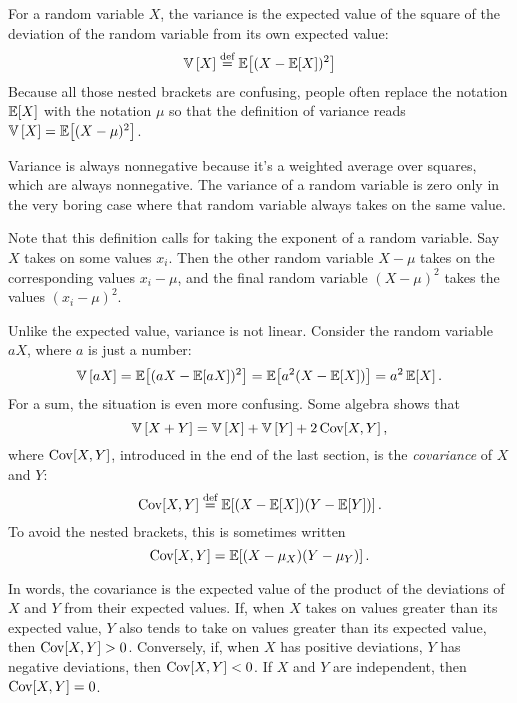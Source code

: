 For a random variable $X$, the variance is the expected value of the square of
the deviation of the random variable from its own expected value:
\begin{equation*}
\mathbb{V}\left[{X}\right] \stackrel{\text{def}}{=} \mathbb{E}\!\left[{(X - \mathbb{E}\!\left[{X}\right])^2}\right]
\end{equation*}
Because all those nested brackets are confusing, people often replace the
notation $\mathbb{E}\!\left[{X}\right]$ with the notation $\mu$ so that the definition of
variance reads $\mathbb{V}\left[{X}\right] = \mathbb{E}\!\left[{(X - \mu)^2}\right]$.

Variance is always nonnegative because it's a weighted average over squares,
which are always nonnegative. The variance of a random variable is zero only
in the very boring case where that random variable always takes on the same
value.

Note that this definition calls for taking the exponent of a random variable.
Say $X$ takes on some values $x_i$. Then the other random variable $X - \mu$
takes on the corresponding values $x_i - \mu$, and the final random variable
$(X - \mu)^2$ takes the values $(x_i - \mu)^2$.

Unlike the expected value, variance is not linear. Consider the random variable $aX$,
where $a$ is just a number:
\begin{equation}
\mathbb{V}\left[{aX}\right] = \mathbb{E}\!\left[{(aX - \mathbb{E}\!\left[{aX}\right])^2}\right] = \mathbb{E}\!\left[{a^2(X - \mathbb{E}\!\left[{X}\right])}\right] = a^2 \, \mathbb{E}\!\left[{X}\right].
\end{equation}
For a sum, the situation is even more confusing. Some algebra shows that
\begin{equation*}
\mathbb{V}\left[{X + Y}\right] = \mathbb{V}\left[{X}\right] + \mathbb{V}\left[{Y}\right] + 2 \,\mathrm{Cov}\!\left[{X, Y}\right],
\end{equation*}
where $\mathrm{Cov}\!\left[{X, Y}\right]$, introduced in the end of the last section, is the
\emph{covariance} of $X$ and $Y$:
\begin{equation}
\mathrm{Cov}\!\left[{X, Y}\right] \stackrel{\text{def}}{=} \mathbb{E}\!\left[{(X - \mathbb{E}\!\left[{X}\right])(Y - \mathbb{E}\!\left[{Y}\right])}\right].
\end{equation}
To avoid the nested brackets, this is sometimes written
\begin{equation}
\mathrm{Cov}\!\left[{X, Y}\right] = \mathbb{E}\!\left[{(X - \mu_X)(Y - \mu_Y)}\right].
\end{equation}

In words, the covariance is the expected value of the product of the
deviations of $X$ and $Y$ from their expected values. If, when $X$ takes on
values greater than its expected value, $Y$ also tends to take on values
greater than its expected value, then $\mathrm{Cov}\!\left[{X, Y}\right] > 0$. Conversely, if, when
$X$ has positive deviations, $Y$ has negative deviations, then $\mathrm{Cov}\!\left[{X, Y}\right] <
0$. If $X$ and $Y$ are independent, then $\mathrm{Cov}\!\left[{X, Y}\right] = 0$.

